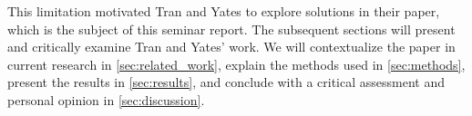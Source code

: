 This limitation motivated Tran and Yates \cite{tran2022dense} to explore solutions in their paper, which is the subject of this seminar report. The subsequent sections will present and critically examine Tran and Yates' work. We will contextualize the paper in current research in \autoref{sec:related_work}, explain the methods used in \autoref{sec:methods}, present the results in \autoref{sec:results}, and conclude with a critical assessment and personal opinion in \autoref{sec:discussion}.


